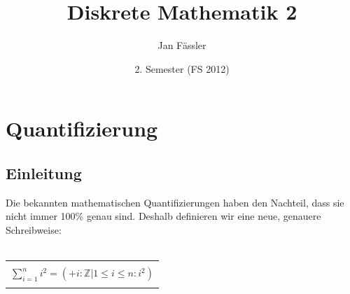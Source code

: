\documentclass[a4paper,10pt]{article}
\title{Diskrete Mathematik 2}
\author{Jan F\"assler}
\date{2. Semester (FS 2012)}
\newcommand{\ZN}{\mathbb{Z}} %
\begin{document}
\maketitle
\newpage
\thispagestyle{fancy} %

\section{Quantifizierung}

\subsection{Einleitung}
Die bekannten mathematischen Quantifizierungen haben den Nachteil, dass sie nicht immer 100\% genau sind. Deshalb definieren wir eine neue, genauere Schreibweise: \\ \\
\begin{tabular}{| c |}
\hline
\\  $\sum_{i=1}^{n} i^2=(+i:\ZN | 1 \leq i \leq n:i^2)$ \\ \\
\hline
\end{tabular}
\end{document}
